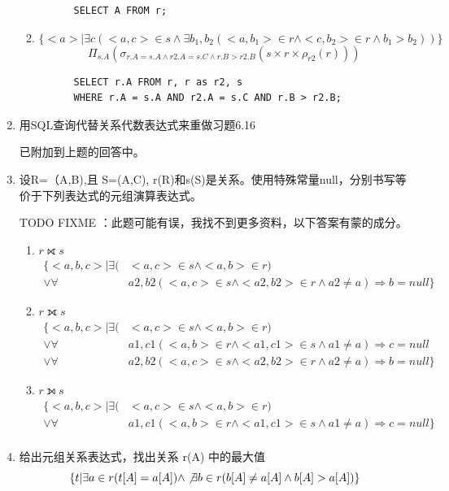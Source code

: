 \documentclass{dingjia}
\begin{document}
\begin{enumerate}
\begin{enumerate}
    \begin{verbatim}
      SELECT A FROM r;
    \end{verbatim}

  \item \[\{ <a> | \exists c(<a,c> \in s \land \exists b_1,b_2(<a,b_1> \in r
      \land <c, b_2> \in r \land b_1 > b_2))\}\]
    \[ \Pi_{s.A}(\sigma_{r.A = s.A \land r2.A = s.C \land r.B > r2.B}(s \times r \times \rho_{r2}(r)))\]

    \begin{verbatim}
      SELECT r.A FROM r, r as r2, s
      WHERE r.A = s.A AND r2.A = s.C AND r.B > r2.B;
    \end{verbatim}

  \end{enumerate}
\item 用SQL查询代替关系代数表达式来重做习题6.16

  已附加到上题的回答中。

\item 设R=（A,B),且 S=(A,C), r(R)和s(S)是关系。使用特殊常量null，分别书写等
  价于下列表达式的元组演算表达式。

  TODO FIXME ：此题可能有误，我找不到更多资料，以下答案有蒙的成分。

  \begin{enumerate}
  \item $ r ⟖ s $
    \begin{align*}
      \{<a,b,c> | \exists( & <a,c> \in s \land <a,b> \in r) \\
      \lor \forall & a2,b2(<a,c> \in s \land <a2,b2> \in r \land a2 \not = a)  \Rightarrow b = null \}
    \end{align*}

  \item $ r ⟗ s $
    \begin{align*}
      \{<a,b,c> | \exists( & <a,c> \in s \land <a,b> \in r) \\
      \lor\forall & a1,c1(<a,b> \in r \land <a1,c1> \in s \land a1 \not = a)  \Rightarrow c = null\\
      \lor\forall & a2,b2(<a,c> \in s \land <a2,b2> \in r \land a2 \not = a)  \Rightarrow b = null \}
    \end{align*}

  \item $ r ⟕ s $
    \begin{align*}
      \{<a,b,c> | \exists( & <a,c> \in s \land <a,b> \in r) \\
      \lor\forall & a1,c1(<a,b> \in r \land <a1,c1> \in s \land a1 \not = a)  \Rightarrow c = null \}\\
    \end{align*}
  \end{enumerate}

\item 给出元组关系表达式，找出关系 r(A) 中的最大值
  \[ \{ t|\exists a \in r(t[A] = a[A]) \land \not \exists b \in r(b[A] \neq
    a[A] \land b[A] > a[A]) \} \]
\end{enumerate}
\end{document}
